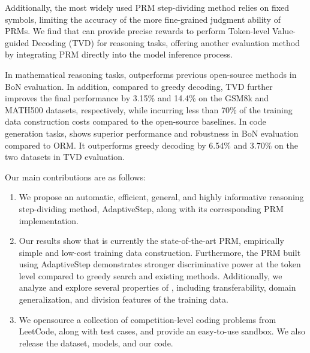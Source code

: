 Additionally, the most widely used PRM step-dividing method relies on fixed symbols, limiting the accuracy of the more fine-grained judgment ability of PRMs. We find that \MethodName \hspace{1pt} can provide precise rewards to perform Token-level Value-guided Decoding (TVD) for reasoning tasks, offering another evaluation method by integrating PRM directly into the model inference process.

\vspace{-0.3em}

In mathematical reasoning tasks, \MethodName \hspace{1pt} outperforms previous open-source methods in BoN evaluation. In addition, compared to greedy decoding, TVD further improves the final performance by 3.15\% and 14.4\%  on the GSM8k and MATH500 datasets, respectively, while incurring less than 70\% of the training data construction costs compared to the open-source baselines. 
In code generation tasks, \MethodName \hspace{1pt} shows superior performance and robustness in BoN evaluation compared to ORM. It outperforms greedy decoding by 6.54\% and 3.70\% on the two datasets in TVD evaluation.





Our main contributions are as follows: 
\begin{enumerate} 
\item We propose an automatic, efficient, general, and highly informative reasoning step-dividing method, AdaptiveStep, along with its corresponding PRM implementation. 
\item Our results show that \MethodName \hspace{1pt} is currently the state-of-the-art PRM, empirically simple and low-cost training data construction. Furthermore, the PRM built using AdaptiveStep demonstrates stronger discriminative power at the token level compared to greedy search and existing methods. Additionally, we analyze and explore several properties of \MethodName \hspace{1pt}, including transferability, domain generalization, and division features of the training data. 
\item We opensource a collection of competition-level coding problems from LeetCode, along with test cases, and provide an easy-to-use sandbox. We also release the dataset, models, and our code. \end{enumerate}
